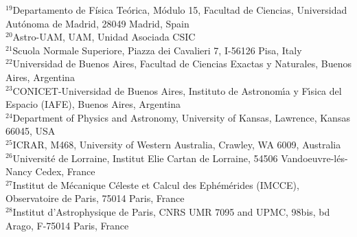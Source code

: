 \documentclass[useAMS,usenatbib]{mnras}
\begin{document}
{$^{19}$Departamento de F\'isica Te\'{o}rica, M\'{o}dulo 15, Facultad de Ciencias, Universidad Aut\'{o}noma de Madrid, 28049 Madrid, Spain\\
$^{20}$Astro-UAM, UAM, Unidad Asociada CSIC\\
$^{21}$Scuola Normale Superiore, Piazza dei Cavalieri 7, I-56126 Pisa, Italy\\
$^{22}$Universidad de Buenos Aires, Facultad de Ciencias Exactas y Naturales, Buenos Aires, Argentina\\
$^{23}$CONICET-Universidad de Buenos Aires, Instituto de Astronom\'{\i}a y F\'{\i}sica del Espacio (IAFE), Buenos Aires, Argentina\\
$^{24}$Department of Physics and Astronomy, University of Kansas, Lawrence, Kansas 66045, USA\\
$^{25}$ICRAR, M468, University of Western Australia, Crawley, WA 6009, Australia \\
$^{26}$Universit\'e de Lorraine, Institut Elie Cartan de Lorraine, 54506 Vandoeuvre-l\'es-Nancy Cedex, France\\
$^{27}$Institut de M\'ecanique C\'eleste et Calcul des Eph\'em\'erides (IMCCE), Observatoire de Paris, 75014 Paris, France\\
$^{28}$Institut d'Astrophysique de Paris, CNRS UMR 7095 and UPMC, 98bis, bd Arago, F-75014 Paris, France
}
\end{document}
